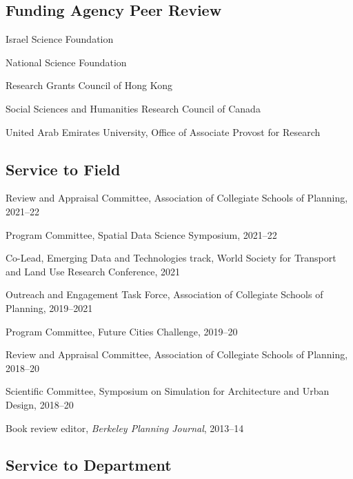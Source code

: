 \documentclass[12pt,letterpaper]{report}
\newcommand{\listitemspace}{0.25em}
\renewenvironment{itemize}
{\begin{list}{}{\setlength{\leftmargin}{0em}
                \setlength{\parskip}{0em}
                \setlength{\itemsep}{\listitemspace}
                \setlength{\parsep}{\listitemspace}}}
{\end{list}}
\begin{document}
    \subsection*{Funding Agency Peer Review}

    \begin{itemize}

        \item Israel Science Foundation
        \item National Science Foundation
        \item Research Grants Council of Hong Kong
        \item Social Sciences and Humanities Research Council of Canada
        \item United Arab Emirates University, Office of Associate Provost for Research

    \end{itemize}

    \subsection*{Service to Field}

    \begin{itemize}

        \item Review and Appraisal Committee, Association of Collegiate Schools of Planning, 2021--22
        \item Program Committee, Spatial Data Science Symposium, 2021--22
        \item Co-Lead, Emerging Data and Technologies track, World Society for Transport and Land Use Research Conference, 2021
        \item Outreach and Engagement Task Force, Association of Collegiate Schools of Planning, 2019--2021
        \item Program Committee, Future Cities Challenge, 2019--20
        \item Review and Appraisal Committee, Association of Collegiate Schools of Planning, 2018--20
        \item Scientific Committee, Symposium on Simulation for Architecture and Urban Design, 2018--20
        \item Book review editor, \textit{Berkeley Planning Journal}, 2013--14

    \end{itemize}

    \subsection*{Service to Department}
\end{document}
